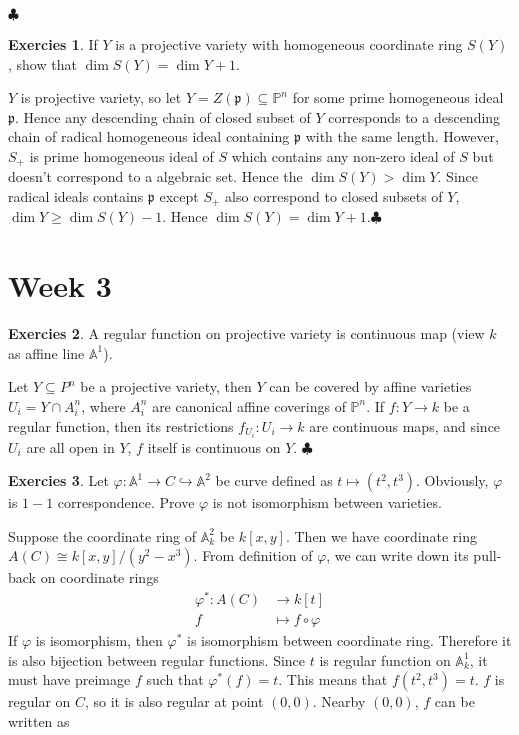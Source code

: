 \documentclass[12pt,a4paper]{article}
\theoremstyle{definition}
\newtheorem{exer}{Exercies}[section]
\newcommand*{\qeds}{\hfill\ensuremath{\clubsuit}}
\begin{document}
\qeds
\begin{exer}
	If $Y$ is a projective variety with homogeneous coordinate ring $S(Y)$, show that $\dim S(Y) = \dim Y +1$.
\end{exer}
$Y$ is projective variety, so let $Y= Z(\mathfrak{p}) \subseteq \mathbb{P}^n$ for some prime homogeneous ideal $\mathfrak{p}$. Hence any descending chain of closed subset of $Y$ corresponds to a descending chain of radical homogeneous ideal containing $\mathfrak{p}$ with the same length. However, $S_+$ is prime homogeneous ideal of $S$ which contains any non-zero ideal of $S$ but doesn't correspond to a algebraic set. Hence the $\dim S(Y) > \dim Y$. Since radical ideals contains $\mathfrak{p}$ except $S_+$ also correspond to closed subsets of $Y$, $\dim Y  \geq \dim S(Y)-1$. Hence $\dim S(Y) = \dim Y +1$.\qeds
\newpage
\section{Week 3}
\begin{exer}
	A regular function on projective variety is continuous map (view $k$ as affine line $\mathbb{A}^1$).
\end{exer}
Let $Y \subseteq P^n$ be a projective variety, then $Y$ can be covered by affine varieties $U_i=Y \cap A^n_i$, where $A^n_i$ are canonical affine coverings of $\mathbb{P}^n$. If $f\colon Y \to k$ be a regular function, then its restrictions $f_{U_i} \colon U_i \to k$ are continuous maps, and since $U_i$ are all open in $Y$, $f$ itself is continuous on $Y$. \qeds
\begin{exer}
	Let $\varphi: \mathbb{A}^1 \to C \hookrightarrow \mathbb{A}^2$ be curve defined as $ t \mapsto (t^2,t^3)$. Obviously, $\varphi$ is $1-1$ correspondence. Prove $\varphi$ is not isomorphism between varieties.
\end{exer}
Suppose the coordinate ring of $\mathbb{A}^2_k$ be $k[x,y]$. Then we have coordinate ring $A(C) \cong k[x,y]/(y^2-x^3)$. From definition of $\varphi$, we can write down its pull-back on coordinate rings
\[
\begin{aligned}
\varphi^* \colon A(C) &\to k[t]\\
f& \mapsto f \circ \varphi
\end{aligned}
\]
If $\varphi$ is isomorphism, then $\varphi^*$ is isomorphism between coordinate ring. Therefore it is also bijection between regular functions. Since $t$ is regular function on $\mathbb{A}^1_k$, it must have preimage $f$ such that $\varphi^*(f)=t$. This means that $f(t^2,t^3)=t$. $f$ is regular on $C$, so it is also regular at point $(0,0)$. Nearby $(0,0)$, $f$ can be written as
\end{document}
